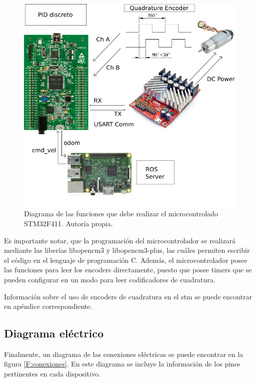 \begin{figure}[H]
\centering
\includegraphics[scale=0.5]{imagenes/microcontrolador_diagrama.png}
\caption{Diagrama de las funciones que debe realizar el microcontrolado STM32F411. Autoría propia.}
\label{F:diagrama_stm}
\end{figure}

Es importante notar, que la programación del microcontrolador se realizará mediante las liberías libopencm3 y libopencm3-plus, las cuáles permiten escribir el código en el lenguaje de programación C. Además, el microcontrolador posee las funciones para leer los encoders directamente, puesto que posee timers que se pueden configurar en un modo para leer codificadores de cuadratura.

Información sobre el uso de encoders de cuadratura en el stm se puede encontrar en apéndice correspondiente.

\subsection{Diagrama eléctrico}

Finalmente, un diagrama de las conexiones eléctricas se puede encontrar en la figura \ref{F:conexiones}. En este diagrama se incluye la información de los pines pertinentes en cada dispositivo.

